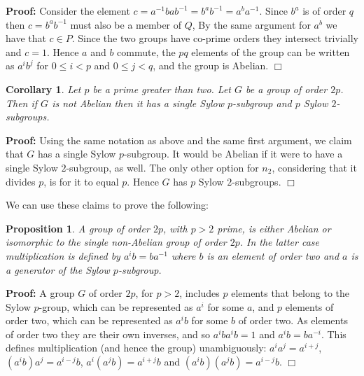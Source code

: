 \documentclass[11pt]{article} \usepackage{amssymb}
\newtheorem{proposition}[theorem]{Proposition}
\newtheorem{corollary}[theorem]{Corollary}
\newenvironment{proof}{\noindent \textbf{Proof:}}{$\Box$}
\begin{document}
\begin{enumerate}
\begin{proof}
      Consider the element $c=a^{-1}bab^{-1}=b^ab^{-1}=a^ba^{-1}$. Since
      $b^a$ is of order $q$ then $c=b^ab^{-1}$ must also be a member of $Q$, 
      By the same argument for $a^b$ we have that $c \in P$. Since
      the two groups have co-prime orders they intersect trivially and $c=1$. 
      Hence $a$ and $b$ commute, the $pq$ elements of the group can be written 
      as $a^ib^j$ for $0\leq i <p$ and $0\leq j < q$, and the group is Abelian.
    \end{proof}
    \begin{corollary}
      \label{prop:2p_groups}
      Let $p$ be a prime greater than two. Let $G$ be a group of order
      $2p$. Then if $G$ is not Abelian then it has a single Sylow $p$-subgroup
      and $p$ Sylow $2$-subgroups.
    \end{corollary}
    \begin{proof}
      Using the same notation as above and the same first argument, we claim
      that $G$ has a single Sylow $p$-subgroup. It would be Abelian if it were 
      to have a single Sylow $2$-subgroup, as well. The only other option for
      $n_2$, considering that it divides $p$, is for it to equal $p$. Hence
      $G$ has $p$ Sylow $2$-subgroups.
    \end{proof}

    We can use these claims to prove the following:
    \begin{proposition}
      \label{prop:2p_unique}
      A group of order $2p$, with $p>2$ prime, is either Abelian or isomorphic 
      to the single non-Abelian
      group of order $2p$. In the latter case multiplication is defined by
      $a^ib=ba^{-1}$ where $b$ is an element of order two and $a$ is a generator
      of the Sylow $p$-subgroup.
    \end{proposition}
    \begin{proof}
      A group $G$ of order $2p$, for $p>2$, includes $p$ elements that 
      belong to the Sylow $p$-group,
      which can be represented as $a^i$ for some $a$, and $p$ elements of order
      two, which can be represented as $a^ib$ for some $b$ of order two. As
      elements of order two they are their own inverses, and so $a^iba^ib=1$ and
      $a^ib=ba^{-i}$. This defines multiplication (and hence the group) 
      unambiguously: $a^ia^j=a^{i+j}$,
      $(a^ib)a^j=a^{i-j}b$, $a^i(a^jb)=a^{i+j}b$ and $(a^ib)(a^jb)=a^{i-j}b$.
    \end{proof}


\end{enumerate}
\end{document}
